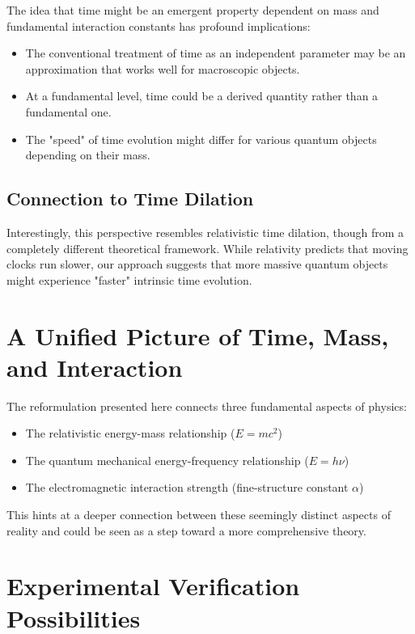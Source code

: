 \documentclass{article}
\begin{document}
	The idea that time might be an emergent property dependent on mass and fundamental interaction constants has profound implications:
	\begin{itemize}
		\item The conventional treatment of time as an independent parameter may be an approximation that works well for macroscopic objects.
		\item At a fundamental level, time could be a derived quantity rather than a fundamental one.
		\item The "speed" of time evolution might differ for various quantum objects depending on their mass.
	\end{itemize}
	
	\subsection{Connection to Time Dilation}
	
	Interestingly, this perspective resembles relativistic time dilation, though from a completely different theoretical framework. While relativity predicts that moving clocks run slower, our approach suggests that more massive quantum objects might experience "faster" intrinsic time evolution.
	
	\section{A Unified Picture of Time, Mass, and Interaction}
	
	The reformulation presented here connects three fundamental aspects of physics:
	\begin{itemize}
		\item The relativistic energy-mass relationship (\(E = mc^2\))
		\item The quantum mechanical energy-frequency relationship (\(E = h\nu\))
		\item The electromagnetic interaction strength (fine-structure constant \(\alpha\))
	\end{itemize}
	
	This hints at a deeper connection between these seemingly distinct aspects of reality and could be seen as a step toward a more comprehensive theory.
	
	\section{Experimental Verification Possibilities}
	
\end{document}
